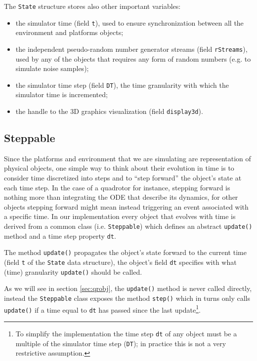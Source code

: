 \documentclass[a4paper,11pt]{report}
\begin{document}
The \texttt{State} structure stores also other important variables:
\begin{itemize}
 \item the simulator time (field \texttt{t}), used to ensure synchronization between all the environment and platforms objects;
 \item the independent pseudo-random number generator streams (field \texttt{rStreams}), used by any of the objects that requires any form of random numbers (e.g. to simulate noise samples);
 \item the simulator time step (field \texttt{DT}), the time granularity with which the simulator time is incremented;
 \item the handle to the 3D graphics visualization (field \texttt{display3d}).
\end{itemize}

\subsection{Steppable}

Since the platforms and environment that we are simulating are representation of physical objects, one simple way to think about their evolution in time is to consider time discretized into steps and to ``step forward'' the object's state at each time step. In the case of a quadrotor for instance, stepping forward is nothing more than integrating the ODE that describe its dynamics, for other objects stepping forward might mean instead triggering an event associated with a specific time.
In our implementation every object that evolves with time is derived from a common class (i.e. \texttt{Steppable}) which defines an abstract \texttt{update()} method and a time step property \texttt{dt}.

The method \texttt{update()} propagates the object's state forward to the current time (field \texttt{t} of the \texttt{State} data structure), the object's field \texttt{dt} specifies with what (time) granularity \texttt{update()} should be called. 

As we will see in section \ref{sec:qrobj}, the \texttt{update()} method is never called directly, instead the  \texttt{Steppable} class exposes the method \texttt{step()} which in turns only calls \texttt{update()} if a time equal to \texttt{dt} has passed since the last update\footnote{To simplify the implementation the time step \texttt{dt} of any object must be a multiple of the simulator time step (\texttt{DT}); in practice this is not a very restrictive assumption.}.
\end{document}
